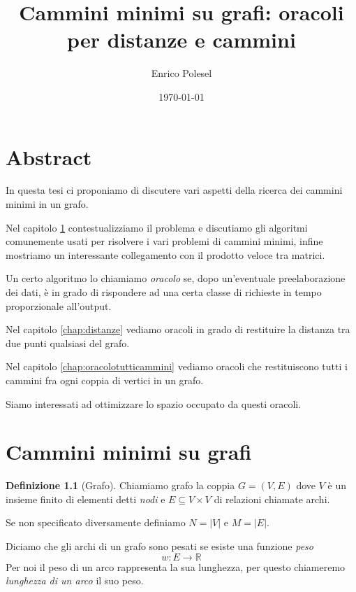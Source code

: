 \documentclass[a4paper,10pt]{amsbook}
\title{Cammini minimi su grafi: oracoli per distanze e cammini}
\author{Enrico Polesel}
\date{\today}
\newcounter{counter1}
\theoremstyle{plain}
\theoremstyle{definition}
\newtheorem{mydef}[counter1]{Definizione}
\theoremstyle{remark}
\newcommand{\abs}[1]{\left|#1\right|}
\begin{document}
\maketitle


\setcounter{tocdepth}{5}



\tableofcontents

\chapter*{Abstract}

In questa tesi ci proponiamo di discutere vari aspetti della ricerca
dei cammini minimi in un grafo.

Nel capitolo \ref{chap:camminiminimi} contestualizziamo il problema e
discutiamo gli algoritmi comunemente usati per risolvere i vari
problemi di cammini minimi, infine mostriamo un interessante
collegamento con il prodotto veloce tra matrici.

Un certo algoritmo lo chiamiamo \textit{oracolo} se, dopo
un'eventuale preelaborazione dei dati, \`e in grado di rispondere ad
una certa classe di richieste in tempo proporzionale all'output.

Nel capitolo \ref{chap:distanze} vediamo oracoli in grado di
restituire la distanza tra due punti qualsiasi del grafo.

Nel capitolo \ref{chap:oracolotutticammini} vediamo oracoli che
restituiscono tutti i cammini fra ogni coppia di vertici in un grafo.

Siamo interessati ad ottimizzare lo spazio occupato da questi oracoli.


\chapter{Cammini minimi su grafi}
\label{chap:camminiminimi}

\begin{mydef}[Grafo]
  Chiamiamo grafo la coppia $G = (V,E)$ dove $V$ è un insieme finito
  di elementi detti \textit{nodi} e $E\subseteq V \times V$ di
  relazioni chiamate archi.
\end{mydef}

Se non specificato diversamente definiamo $N = \abs{V}$ e $M =
\abs{E}$.

Diciamo che gli archi di un grafo sono pesati se esiste una funzione
\textit{peso}
\[ w : E \rightarrow \mathbb{R} \]
Per noi il peso di un arco rappresenta la sua lunghezza, per questo
chiameremo \textit{lunghezza di un arco} il suo peso.
\end{document}
